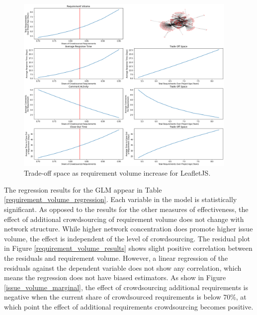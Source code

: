 \begin{figure}
  \includegraphics[width=0.95\textwidth]{leaflet_trade_space.png}
\caption{Trade-off space as requirement volume increase for LeafletJS.}
\label{leaflet_trade_space}
\end{figure}

The regression results for the GLM appear in Table \ref{requirement_volume_regression}. Each variable in the model is statistically significant. As opposed to the results for the other measures of effectiveness, the effect of additional crowdsourcing of requirement volume does not change with network structure. While higher network concentration does promote higher issue volume, the effect is independent of the level of crowdsourcing.  The residual plot in Figure \ref{requirement_volume_results} shows slight positive correlation between the residuals and requirement volume. However, a linear regression of the residuals against the dependent variable does not show any correlation, which means the regression does not have biased estimators. As show in Figure \ref{issue_volume_marginal}, the effect of crowdsourcing additional requirements is negative when the current share of crowdsourced requirements is below 70\%, at which point the effect of additional requirements crowdsourcing becomes positive.

